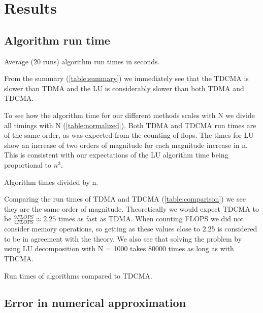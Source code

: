 \section*{Results}


\subsection*{Algorithm run time}

\begin{table}[htp]
  \centering
  \caption{Average (20 runs) algorithm run times in seconds.}
  \label{table:summary}
\end{table}


From the summary (\cref{table:summary}) we immediately see that the
TDCMA is slower than TDMA and the LU is considerably slower than both TDMA and
TDCMA.

To see how the algorithm time for our different methods scales with N we divide
all timings with N (\cref{table:normalized}). Both TDMA and TDCMA run times are
of the same order, as was expected from the counting of flops. The times for LU
show an increase of two orders of magnitude for each magnitude increase in n.
This is consistent with our expectations of the LU algorithm time being
proportional to $n^3$.

\begin{table}[htp]
  \centering
  \caption{Algorithm times divided by n.}
  \label{table:normalized}
\end{table}


Comparing the run times of TDMA and TDCMA (\cref{table:comparison})
we see they are the same order of magnitude. Theoretically we would
expect TDCMA to be $\frac{9 FLOPS}{4 FLOPS} \approx 2.25$ times as fast as
TDMA. When counting FLOPS we did not consider memory operations, so getting as
these values close to 2.25 is considered to be in agreement with the theory.
We also see that solving the problem by using LU decomposition with N = 1000
takes 80000 times as long as with TDCMA.

\begin{table}[htp]
  \centering
  \caption{Run times of algorithms compared to TDCMA.}
  \label{table:comparison}
\end{table}


\subsection*{Error in numerical approximation}

